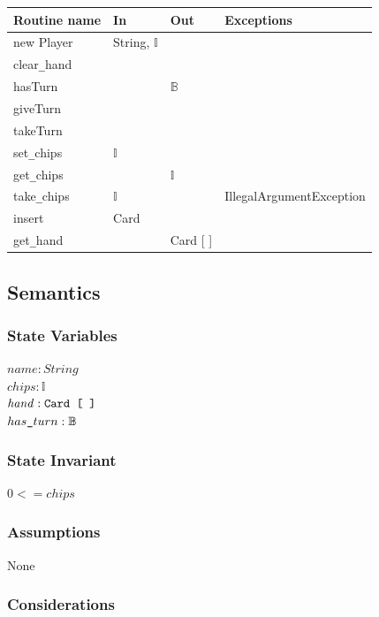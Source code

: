 \documentclass[12pt, titlepage]{article}
\begin{document}
\begin{tabular}{| l | l | l | p{5cm} |}
\hline
\textbf{Routine name} & \textbf{In} & \textbf{Out} & \textbf{Exceptions}\\
\hline 
new Player & String, $\mathbb{I}$ & &\\
\hline
clear\verb|_|hand & & &\\
\hline
hasTurn & & $\mathbb{B}$ &\\
\hline 
giveTurn & & &\\
\hline 
takeTurn & & &\\
\hline 
set\verb|_|chips & $\mathbb{I}$ & &\\
\hline 
get\verb|_|chips & & $\mathbb{I}$ &\\
\hline 
take\verb|_|chips & $\mathbb{I}$ & & IllegalArgumentException\\
\hline 
insert & Card & &\\
\hline 
get\verb|_|hand & & Card [ ] &\\
\hline 
\end{tabular}

\subsection* {Semantics}

\subsubsection* {State Variables}

$\mathit{name}: String$\\
$\mathit{chips}: \mathbb{I}$ \\
$\mathit{hand} : \verb|Card [ ]|$\\
$has\verb|_|turn : \mathbb{B}$

\subsubsection* {State Invariant}

$0 <= \mathit{chips}$

\subsubsection* {Assumptions}

None

\subsubsection* {Considerations}
\end{document}
